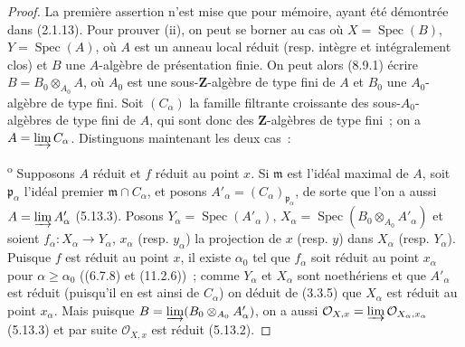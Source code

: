\begin{proof}
La première assertion n'est mise que pour mémoire, ayant été démontrée dans
(2.1.13). Pour prouver (ii), on peut se borner au cas où $X=\operatorname{Spec}(B)$,
$Y=\operatorname{Spec}(A)$, où $A$ est un anneau local réduit (resp. intègre et
intégralement clos) et $B$ une $A$-algèbre de présentation finie. On peut alors
(8.9.1) écrire $B=B_0\otimes_{A_0}A$,
où $A_0$ est une sous-$\mathbf Z$-algèbre de type fini de $A$ et $B_0$ une
$A_0$-algèbre de type fini. Soit $(C_\alpha)$ la famille filtrante croissante
des sous-$A_0$-algèbres de type fini de $A$, qui sont donc des
$\mathbf Z$-algèbres de type fini~; on a $A=\varinjlim C_\alpha$. Distinguons
maintenant les deux cas~:

\textsuperscript{o} Supposons $A$ réduit et $f$ réduit au point
$x$. Si $\mathfrak m$ est l'idéal maximal de $A$, soit
$\mathfrak p_\alpha$ l'idéal premier $\mathfrak m\cap C_\alpha$, et posons
$A'_\alpha=(C_\alpha)_{\mathfrak p_\alpha}$, de sorte que l'on a aussi
$A=\varinjlim A'_\alpha$ (5.13.3). Posons
$Y_\alpha=\operatorname{Spec}(A'_\alpha)$,
$X_\alpha=\operatorname{Spec}(B_0\otimes_{A_0}A'_\alpha)$ et soient
$f_\alpha:X_\alpha\to Y_\alpha$, $x_\alpha$ (resp. $y_\alpha$) la projection
de $x$ (resp. $y$) dans $X_\alpha$ (resp. $Y_\alpha$). Puisque $f$ est réduit
au point $x$, il existe $\alpha_0$ tel que $f_\alpha$ soit réduit au point
$x_\alpha$ pour $\alpha\geq\alpha_0$ ((6.7.8) et (11.2.6))~; comme
$Y_\alpha$ et $X_\alpha$ sont noethériens et que $A'_\alpha$ est réduit
(puisqu'il en est ainsi de $C_\alpha$) on déduit de (3.3.5) que $X_\alpha$
est réduit au point $x_\alpha$. Mais puisque
$B=\varinjlim(B_0\otimes_{A_0}A'_\alpha)$, on a aussi
$\mathcal O_{X,x}=\varinjlim\mathcal O_{X_\alpha,x_\alpha}$ (5.13.3) et par
suite $\mathcal O_{X,x}$ est réduit (5.13.2).


\end{proof}
